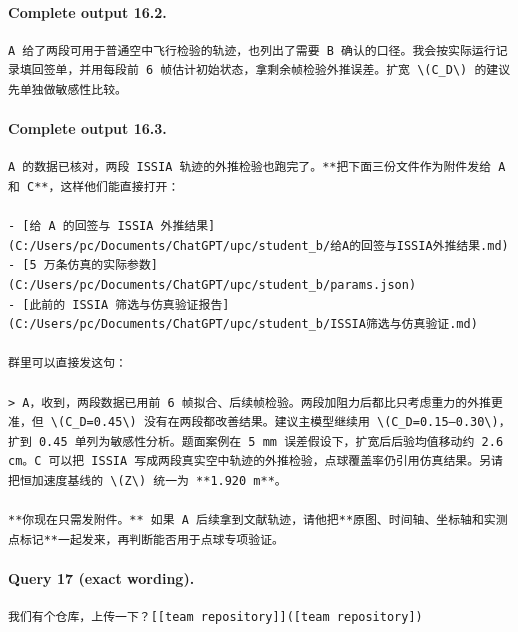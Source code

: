 \documentclass[UTF8,10pt]{ctexart}
\begin{document}
\paragraph{Complete output 16.2.}
\begin{Verbatim}[breaklines=true,breakanywhere=true,fontsize=\scriptsize,frame=single,framesep=2pt]
A 给了两段可用于普通空中飞行检验的轨迹，也列出了需要 B 确认的口径。我会按实际运行记录填回签单，并用每段前 6 帧估计初始状态，拿剩余帧检验外推误差。扩宽 \(C_D\) 的建议先单独做敏感性比较。
\end{Verbatim}

\paragraph{Complete output 16.3.}
\begin{Verbatim}[breaklines=true,breakanywhere=true,fontsize=\scriptsize,frame=single,framesep=2pt]
A 的数据已核对，两段 ISSIA 轨迹的外推检验也跑完了。**把下面三份文件作为附件发给 A 和 C**，这样他们能直接打开：

- [给 A 的回签与 ISSIA 外推结果](C:/Users/pc/Documents/ChatGPT/upc/student_b/给A的回签与ISSIA外推结果.md)
- [5 万条仿真的实际参数](C:/Users/pc/Documents/ChatGPT/upc/student_b/params.json)
- [此前的 ISSIA 筛选与仿真验证报告](C:/Users/pc/Documents/ChatGPT/upc/student_b/ISSIA筛选与仿真验证.md)

群里可以直接发这句：

> A，收到，两段数据已用前 6 帧拟合、后续帧检验。两段加阻力后都比只考虑重力的外推更准，但 \(C_D=0.45\) 没有在两段都改善结果。建议主模型继续用 \(C_D=0.15–0.30\)，扩到 0.45 单列为敏感性分析。题面案例在 5 mm 误差假设下，扩宽后后验均值移动约 2.6 cm。C 可以把 ISSIA 写成两段真实空中轨迹的外推检验，点球覆盖率仍引用仿真结果。另请把恒加速度基线的 \(Z\) 统一为 **1.920 m**。

**你现在只需发附件。** 如果 A 后续拿到文献轨迹，请他把**原图、时间轴、坐标轴和实测点标记**一起发来，再判断能否用于点球专项验证。
\end{Verbatim}

\paragraph{Query 17 (exact wording).}
\begin{Verbatim}[breaklines=true,breakanywhere=true,fontsize=\scriptsize,frame=single,framesep=2pt]
我们有个仓库，上传一下？[[team repository]]([team repository])
\end{Verbatim}
\end{document}
